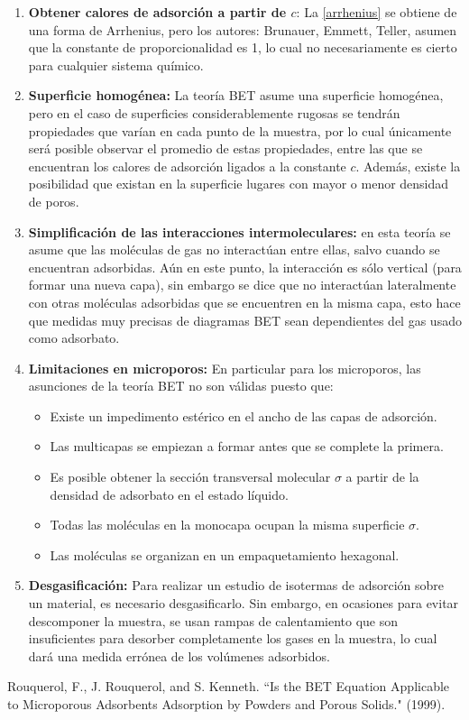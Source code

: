 \documentclass[12pt]{article}
\begin{document}
\begin{enumerate}
\begin{enumerate}
			\item \textbf{Obtener calores de adsorción a partir de $c$}: La \autoref{arrhenius} se obtiene de una forma de Arrhenius, pero los autores: Brunauer, Emmett, Teller, asumen que la constante de proporcionalidad es 1, lo cual no necesariamente es cierto para cualquier sistema químico.
			
			\item \textbf{Superficie homogénea:} La teoría BET asume una superficie homogénea, pero en el caso de superficies considerablemente rugosas se tendrán propiedades que varían en cada punto de la muestra, por lo cual únicamente será posible observar el promedio de estas propiedades, entre las que se encuentran los calores de adsorción ligados a la constante $c$. Además, existe la posibilidad que existan en la superficie lugares con mayor o menor densidad de poros.
			
			\item \textbf{Simplificación de las interacciones intermoleculares:} en esta teoría se asume que las moléculas de gas no interactúan entre ellas, salvo cuando se encuentran adsorbidas. Aún en este punto, la interacción es sólo vertical (para formar una nueva capa), sin embargo se dice que no interactúan lateralmente con otras moléculas adsorbidas que se encuentren en la misma capa, esto hace que medidas muy precisas de diagramas BET sean dependientes del gas usado como adsorbato.
			
			\item \textbf{Limitaciones en microporos:} En particular para los microporos, las asunciones de la teoría BET no son válidas puesto que:
			\begin{itemize}
				\item Existe un impedimento estérico en el ancho de las capas de adsorción.
				\item Las multicapas se empiezan a formar antes que se complete la primera.
				\item Es posible obtener la sección transversal molecular $\sigma$ a partir de la densidad de adsorbato en el estado líquido.
				\item Todas las moléculas en la monocapa ocupan la misma superficie $\sigma$.
				\item Las moléculas se organizan en un empaquetamiento hexagonal.
			\end{itemize} 
			
			\item \textbf{Desgasificación:}
			Para realizar un estudio de isotermas de adsorción sobre un material, es necesario desgasificarlo. Sin embargo, en ocasiones para evitar descomponer la muestra, se usan rampas de calentamiento que son insuficientes para desorber completamente los gases en la muestra, lo cual dará una medida errónea de los volúmenes adsorbidos.
		\end{enumerate}
	\end{enumerate}

	Rouquerol, F., J. Rouquerol, and S. Kenneth. ``Is the BET Equation Applicable to Microporous Adsorbents Adsorption by Powders and Porous Solids." (1999).
\end{document}
